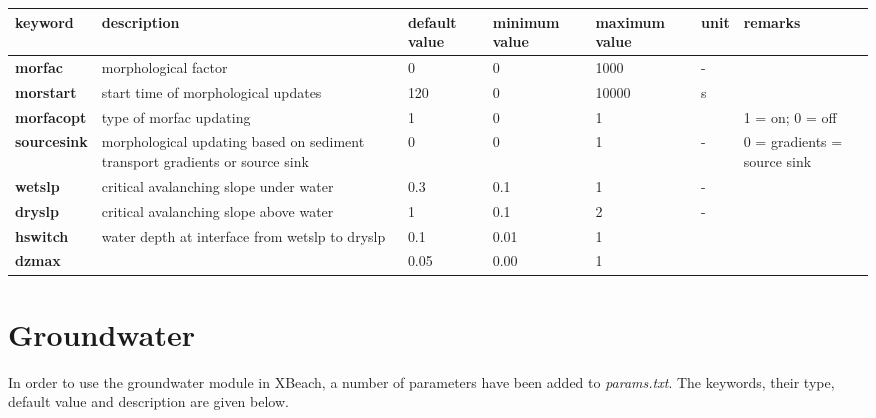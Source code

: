 \begin{tabular}{|p{0.6in}|p{1.0in}|p{0.4in}|p{0.5in}|p{0.5in}|p{0.3in}|p{0.5in}|} \hline 
keyword\textbf{} & description & default value & minimum value & maximum value & unit & remarks \\ \hline 
\textbf{morfac   } & morphological factor & 0 & 0 & 1000 & - &  \\ \hline 
\textbf{morstart } & start time of morphological updates & 120 & 0 & 10000 & s &  \\ \hline 
\textbf{morfacopt} & type of morfac updating & 1 & 0 & 1 &  & 1 = on; 0 = off \\ \hline 
\textbf{sourcesink} & morphological updating based on sediment transport gradients or source sink & 0 & 0 & 1 & - & 0 =  gradients \newline 1= source sink \\ \hline 
\textbf{wetslp   } &  critical avalanching slope under water & 0.3 & 0.1 & 1 & - &  \\ \hline 
\textbf{dryslp   } & critical avalanching slope above water & 1 & 0.1 & 2 & - &  \\ \hline 
\textbf{hswitch  } & water depth at interface from wetslp to dryslp & 0.1 & 0.01 & 1 &  &  \\ \hline 
\textbf{dzmax} &  & 0.05 & 0.00 & 1 &  &  \\ \hline 
\end{tabular}


\section{Groundwater}

In order to use the groundwater module in XBeach, a number of parameters have been added to \textit{params.txt}. The keywords, their type, default value and description are given below.

